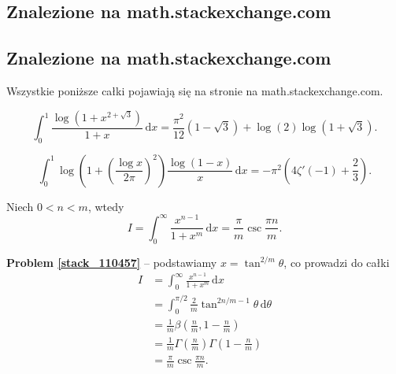 %

\subsection{Znalezione na math.stackexchange.com}
\subsection{Znalezione na math.stackexchange.com} %
Wszystkie poniższe całki pojawiają się na stronie na math.stackexchange.com.

\begin{problem}[pytanie 426325]
    \label{stack_426325}%
    \begin{equation}
        \int_0^1 \frac{\log \left(1 + x^{2 + \sqrt 3}\right)}{1 + x} \,\mathrm{d} x = \frac{\pi^2}{12} (1 - \sqrt 3) + \log (2) \log(1 + \sqrt 3).
    \end{equation}
\end{problem}

\begin{problem}[pytanie 523027]
    \label{stack_523027}%
    \begin{equation}
        \int_0^1 \log\left(1+\left(\frac{\log x}{2\pi}\right)^2 \right)\frac{\log(1-x)}x \,\mathrm{d} x=-\pi^2\left(4\zeta'(-1)+\frac23\right).
    \end{equation}
\end{problem}

\begin{problem}[pytanie 110457]
    \label{stack_110457}%
    Niech $0 < n < m$, wtedy
    \begin{equation}
        I = \int_0^\infty \frac{x^{n-1}}{1 + x^m} \,\mathrm{d} x = \frac \pi m \operatorname{csc} \frac {\pi n}{m}.
    \end{equation}
\end{problem}

\textbf{Problem \ref{stack_110457}} -- podstawiamy $x = \tan^{2/m} \theta$, co prowadzi do całki %
\begin{align} %
    I & = \int_0^\infty \frac{x^{n-1}}{1 + x^m} \,\mathrm{d} x \\ %
      & = \int_0^{\pi/2} \frac 2 m \tan^{2n/m - 1} \theta \,\mathrm{d}\theta \\ %
      & = \frac 1 m \beta\left( \frac nm, 1 - \frac nm \right) \\ %
      & = \frac 1 m \Gamma \left(\frac nm\right) \Gamma \left(1 - \frac nm\right) \\ %
      & = \frac \pi m \operatorname{csc} \frac {\pi n}{m}. %
\end{align} %





